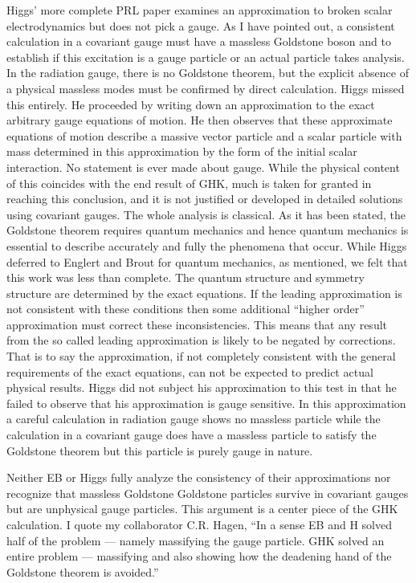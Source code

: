 \documentclass[12pt]{article}
\begin{document}
  Higgs' more complete PRL paper \cite{ph;1964} examines an approximation to
  broken scalar electrodynamics but does not pick a gauge.  As I have pointed
  out, a consistent calculation in a covariant gauge must have a massless
  Goldstone boson and to establish if this excitation is a gauge particle or
  an actual particle takes analysis. In the radiation gauge, there is no
  Goldstone theorem, but the explicit absence of a physical massless modes
  must be confirmed by direct calculation. Higgs missed this entirely. He
  proceeded by writing down an approximation to the exact arbitrary gauge
  equations of motion. He then observes that these approximate equations of
  motion describe a massive vector particle and a scalar particle with mass
  determined in this approximation by the form of the initial scalar
  interaction. No statement is ever made about gauge. While the physical
  content of this coincides with the end result of GHK, much is taken for
  granted in reaching this conclusion, and it is not justified or developed in
  detailed solutions using covariant gauges. The whole analysis is classical.
  As it has been stated, the Goldstone theorem requires quantum mechanics and
  hence quantum mechanics is essential to describe accurately and fully the
  phenomena that occur. While Higgs deferred to Englert and Brout for quantum
  mechanics, as mentioned, we felt that this work was less than complete. The
  quantum structure and symmetry structure are determined by the exact
  equations. If the leading approximation is not consistent with these
  conditions then some additional ``higher order'' approximation must correct
  these inconsistencies. This means that any result from the so called leading
  approximation is likely to be negated by corrections. That is to say the
  approximation, if not completely consistent with the general requirements of
  the exact equations, can not be expected to predict actual physical results.
  Higgs did not subject his approximation to this test in that he failed to
  observe that his approximation is gauge sensitive. In this approximation a
  careful calculation in radiation gauge shows no massless particle while the
  calculation in a covariant gauge does have a massless particle to satisfy
  the Goldstone theorem but this particle is purely gauge in nature.

  Neither EB or Higgs fully analyze the consistency of their approximations
  nor recognize that massless Goldstone Goldstone particles survive in
  covariant gauges but are unphysical gauge particles. This argument is a
  center piece of the GHK calculation. I quote my collaborator C.R. Hagen,
  ``In a sense EB and H solved half of the problem --- namely massifying the
  gauge particle.  GHK solved an entire problem --- massifying and also showing
  how the deadening hand of the Goldstone theorem is avoided.''
\end{document}
